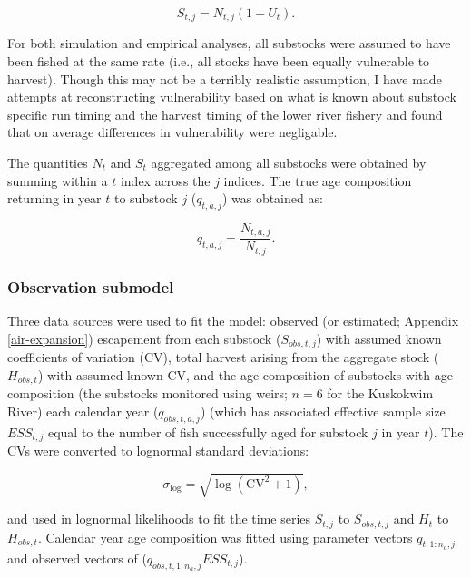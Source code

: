 \documentclass[12pt,]{book}
\theoremstyle{definition}
\theoremstyle{definition}
\theoremstyle{definition}
\theoremstyle{remark}
\begin{document}
\begin{equation}
  S_{t,j}=N_{t,j} (1 - U_t).
  \label{eq:tsm-get-S}
\end{equation}

\noindent
For both simulation and empirical analyses, all substocks were assumed
to have been fished at the same rate (i.e., all stocks have been equally
vulnerable to harvest). Though this may not be a terribly realistic
assumption, I have made attempts at reconstructing vulnerability based
on what is known about substock specific run timing and the harvest
timing of the lower river fishery and found that on average differences
in vulnerability were negligable.

The quantities \(N_t\) and \(S_t\) aggregated among all substocks were
obtained by summing within a \(t\) index across the \(j\) indices. The
true age composition returning in year \(t\) to substock \(j\)
(\(q_{t,a,j}\)) was obtained as:

\begin{equation}
  q_{t,a,j} = \frac{N_{t,a,j}}{N_{t,j}}.
  \label{eq:get-q}
\end{equation}

\subsubsection{Observation submodel}\label{ssm-obs-model}

\noindent
Three data sources were used to fit the model: observed (or estimated;
Appendix \ref{air-expansion}) escapement from each substock
(\(S_{obs,t,j}\)) with assumed known coefficients of variation (CV),
total harvest arising from the aggregate stock (\(H_{obs,t}\)) with
assumed known CV, and the age composition of substocks with age
composition (the substocks monitored using weirs; \(n = 6\) for the
Kuskokwim River) each calendar year (\(q_{obs,t,a,j}\)) (which has
associated effective sample size \(ESS_{t,j}\) equal to the number of
fish successfully aged for substock \(j\) in year \(t\)). The CVs were
converted to lognormal standard deviations:

\begin{equation}
  \sigma_{\text{log}}=\sqrt{\log(\text{CV}^2+1)},
  \label{eq:cv2sig}
\end{equation}

\noindent
and used in lognormal likelihoods to fit the time series \(S_{t,j}\) to
\(S_{obs,t,j}\) and \(H_t\) to \(H_{obs,t}\). Calendar year age
composition was fitted using parameter vectors \(q_{t,1:n_a,j}\) and
observed vectors of (\(q_{obs,t,1:n_a,j} ESS_{t,j}\)).
\end{document}
